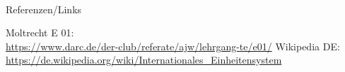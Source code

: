 \renewcommand{\refname}{Referenzen}

\hypertarget{refs}{}
\textcolor{white}{} \\ %
\Large Referenzen/Links
\footnotesize

\begin{thebibliography}{}
   Moltrecht E 01: \\
    \url{https://www.darc.de/der-club/referate/ajw/lehrgang-te/e01/}
      Wikipedia DE: \\
    \url{https://de.wikipedia.org/wiki/Internationales_Einheitensystem}\\
\end{thebibliography}


